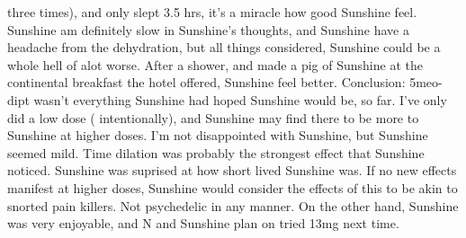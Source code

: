 \documentclass[12pt]{book}
\begin{document}
three times), and only slept 3.5 hrs, it's a miracle how good Sunshine feel. Sunshine am definitely slow in Sunshine's thoughts, and Sunshine have a headache from the dehydration, but all things considered, Sunshine could be a whole hell of alot worse. After a shower, and made a pig of Sunshine at the continental breakfast the hotel offered, Sunshine feel better. Conclusion: 5meo-dipt wasn't everything Sunshine had hoped Sunshine would be, so far. I've only did a low dose ( intentionally), and Sunshine may find there to be more to Sunshine at higher doses. I'm not disappointed with Sunshine, but Sunshine seemed mild. Time dilation was probably the strongest effect that Sunshine noticed. Sunshine was suprised at how short lived Sunshine was. If no new effects manifest at higher doses, Sunshine would consider the effects of this to be akin to snorted pain killers. Not psychedelic in any manner. On the other hand, Sunshine was very enjoyable, and N and Sunshine plan on tried 13mg next time.
\end{document}
